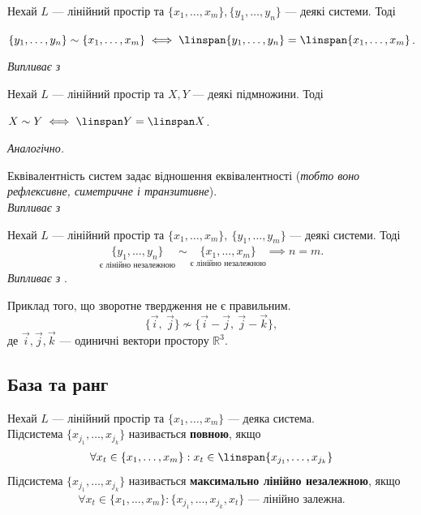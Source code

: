 \documentclass{math_library}
\begin{document}
	\begin{proposition}
	Нехай $L$ --- лінійний простір та $\{x_1,\dots,x_m\}, \{y_1,\dots,y_n\}$ --- деякі системи. Тоді
	\begin{center}
	$\{y_1, \dots, y_n \} \sim \{x_1, \dots, x_m \} \iff \linspan \{y_1, \dots, y_n\} = \linspan \{x_1, \dots, x_m \}$.
	\end{center}
	\textit{Випливає з} 
	\end{proposition}
	
	\begin{proposition}
	Нехай $L$ --- лінійний простір та $X,Y$ --- деякі підмножини. Тоді
	\begin{center}
	$X \sim Y \iff \linspan Y = \linspan X$.
	\end{center}
	\textit{Аналогічно.}
	\end{proposition}
	
	\begin{proposition}
	Еквівалентність систем задає відношення еквівалентності (\textit{тобто воно рефлексивне, симетричне і транзитивне}).\\
	\textit{Випливає з} \prpref{subordinate_properties}
	\end{proposition}
	
	\begin{theorem}
	\label{n_eq_m}
	Нехай $L$ --- лінійний простір та $\{x_1,\dots,x_m\},\ \{y_1,\dots,y_m\}$ --- деякі системи. Тоді 
	\begin{align*}
	\underset{\textrm{є лінійно незалежною}}{\{y_1, \dots, y_n \}} \sim \underset{\textrm{є лінійно незалежною}}{\{x_1, \dots, x_m \}} \implies n = m.
	\end{align*}
	\textit{Випливає з} .
	\end{theorem}
	
	\begin{example}
	Приклад того, що зворотне твердження не є правильним.
	\[
	\{\vec{i},\ \vec{j}\} \not\sim \{\vec{i}-\vec{j},\ \vec{j}-\vec{k}\},
	\]
	де $\vec{i},\vec{j},\vec{k}$ --- одиничні вектори простору $\mathbb{R}^3$.
	\end{example}
	
	\subsection{База та ранг}
	\begin{definition}
	Нехай $L$ --- лінійний простір та $\{x_1,\dots,x_m\}$ --- деяка система.\\
	Підсистема $\{x_{j_1}, \dots, x_{j_k}\}$ називається \textbf{повною}, якщо
	\begin{align*}
	\forall x_t \in \{x_1,\dots,x_m\}: x_t \in \linspan\{x_{j_1},\dots,x_{j_k}\}
	\end{align*}
	Підсистема $\{x_{j_1}, \dots, x_{j_k}\}$ називається \textbf{максимально лінійно незалежною}, якщо
	\begin{align*}
	\forall x_t \in \{x_1, \dots, x_m\}: \{x_{j_1}, \dots, x_{j_k}, x_t\} \textrm{ --- лінійно залежна}.
	\end{align*}
	\end{definition}
	
\end{document}
